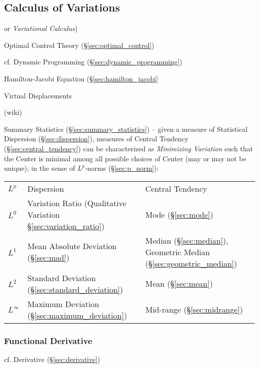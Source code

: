 \subsection{Calculus of Variations}\label{sec:calculus_of_variations}

or \emph{Variational Calculus})

\fist Optimal Control Theory (\S\ref{sec:optimal_control})

\fist cf. Dynamic Programming (\S\ref{sec:dynamic_programming})

Hamilton-Jacobi Equation (\S\ref{sec:hamilton_jacobi}

Virtual Displacements

(wiki)

 Summary Statistics (\S\ref{sec:summary_statistics}) -- given a measure of
 Statistical Dispersion (\S\ref{sec:dispersion}), measures of Central Tendency
 (\S\ref{sec:central_tendency}) can be characterized as \emph{Minimizing
   Variation} such that the Center is minimal among all possible choices of
 Center (may or may not be unique); in the sense of $L^p$-norms
 (\S\ref{sec:p_norm}):
\begin{tabular}{l l l}
  $L^p$ & Dispersion & Central Tendency \\
  $L^0$ & Variation Ratio (Qualitative Variation \S\ref{sec:variation_ratio})
    & Mode (\S\ref{sec:mode}) \\
  $L^1$ & Mean Absolute Deviation (\S\ref{sec:mad})
    & Median (\S\ref{sec:median}),
      Geometric Median (\S\ref{sec:geometric_median}) \\
  $L^2$ & Standard Deviation (\S\ref{sec:standard_deviation})
    & Mean (\S\ref{sec:mean}) \\
  $L^\infty$ & Maximum Deviation (\S\ref{sec:maximum_deviation})
    & Mid-range (\S\ref{sec:midrange})
\end{tabular}



\subsubsection{Functional Derivative}\label{sec:functional_derivative}

\fist cf. Derivative (\S\ref{sec:derivative})



